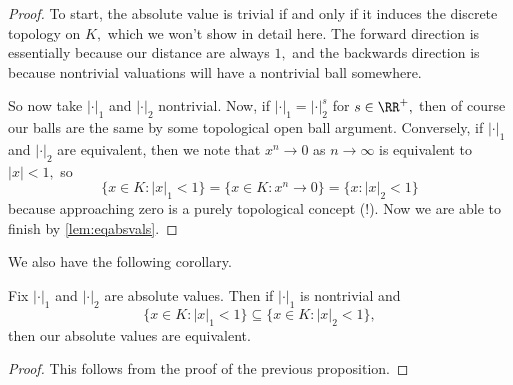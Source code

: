 \documentclass[../notes.tex]{subfiles}
\begin{document}
\begin{proof}
	To start, the absolute value is trivial if and only if it induces the discrete topology on $K,$ which we won't show in detail here. The forward direction is essentially because our distance are always $1,$ and the backwards direction is because nontrivial valuations will have a nontrivial ball somewhere.

	So now take $|\cdot|_1$ and $|\cdot|_2$ nontrivial. Now, if $|\cdot|_1=|\cdot|_2^s$ for $s\in\RR^+,$ then of course our balls are the same by some topological open ball argument. Conversely, if $|\cdot|_1$ and $|\cdot|_2$ are equivalent, then we note that $x^n\to0$ as $n\to\infty$ is equivalent to $|x|<1,$ so
	\[\{x\in K:|x|_1<1\}=\{x\in K:x^n\to0\}=\{x:|x|_2<1\}\]
	because approaching zero is a purely topological concept (!). Now we are able to finish by \autoref{lem:eqabsvals}.
\end{proof}
We also have the following corollary.
\begin{corollary} \label{lem:eqivcor}
	Fix $|\cdot|_1$ and $|\cdot|_2$ are absolute values. Then if $|\cdot|_1$ is nontrivial and
	\[\{x\in K:|x|_1<1\}\subseteq\{x\in K:|x|_2<1\},\]
	then our absolute values are equivalent.
\end{corollary}
\begin{proof}
	This follows from the proof of the previous proposition.
\end{proof}
\end{document}

